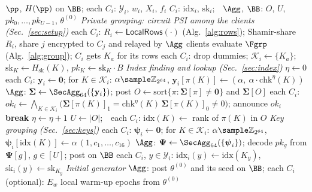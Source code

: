 \begin{algorithm}[t]
\caption{Offline phase: union table and keys (Fig.~\ref{fig:setup})}
\label{alg:setup}
\begin{algorithmic}[1]
\Require $\pp$, $H(\pp)$ on $\BB$; each $C_i$: $\mathcal{Y}_i$, $w_i$, $X_i$, $f_i$
\Ensure $C_i$: $\mathrm{idx}_i$, $\mathrm{sk}_i$;\ \ $\Agg$, $\BB$: $O$, $U$, $pk_0,\dots,pk_{U-1}$, $\theta^{(0)}$
\Statex \textit{Private grouping: circuit PSI among the clients (Sec.~\ref{sec:setup})}
\State each $C_i$: $R_i\gets\mathsf{LocalRows}(\cdot)$ (Alg.~\ref{alg:rows}); Shamir-share $R_i$, share $j$ encrypted to $C_j$ and relayed by $\Agg$
\State clients evaluate $\Fgrp$ (Alg.~\ref{alg:group}); $C_i$ gets $K_a$ for its rows
\State each $C_i$: drop dummies; $\mathcal{K}_i\gets\{K_a\}$; $\mathrm{sk}_K\gets H_{\mathrm{sk}}(K)$, $pk_K\gets\mathrm{sk}_K\cdot B$
\Statex \textit{Index finding and lookup (Sec.~\ref{sec:index})}
\State $\eta\gets0$
\Loop
  \State each $C_i$: $\mathbf{y}_i\gets\mathbf{0}$; for $K\in\mathcal{K}_i$: $\alpha\sample\mathbb{Z}_{2^{64}}$, $\mathbf{y}_i[\pi(K)]\gets(\alpha,\ \alpha\cdot\mathrm{chk}^{\eta}(K))$
  \State $\Agg$: $\boldsymbol{\Sigma}\gets\SecAgg_{64}(\{\mathbf{y}_i\})$; post $O\gets\mathrm{sort}\{\pi:\boldsymbol{\Sigma}[\pi]\neq\mathbf{0}\}$ and $\boldsymbol{\Sigma}[O]$
  \State each $C_i$: $\mathit{ok}_i\gets\bigwedge_{K\in\mathcal{K}_i}\big(\boldsymbol{\Sigma}[\pi(K)]_1=\mathrm{chk}^{\eta}(K)\,\boldsymbol{\Sigma}[\pi(K)]_0\neq0\big)$; announce $\mathit{ok}_i$
   \textbf{break} \EndIf
  \State $\eta\gets\eta+1$ 
\EndLoop
\State $U\gets|O|$;\ \ each $C_i$: $\mathrm{idx}(K)\gets$ rank of $\pi(K)$ in $O$
\Statex \textit{Key grouping (Sec.~\ref{sec:keys})}
\State each $C_i$: $\boldsymbol{\psi}_i\gets\mathbf{0}$; for $K\in\mathcal{K}_i$: $\alpha\sample\mathbb{Z}_{2^{64}}$, $\boldsymbol{\psi}_i[\mathrm{idx}(K)]\gets\alpha\,(1,c_1,\dots,c_{16})$
\State $\Agg$: $\boldsymbol{\Psi}\gets\SecAgg_{64}(\{\boldsymbol{\psi}_i\})$; decode $pk_g$ from $\boldsymbol{\Psi}[g]$, $g\in[U]$; post on $\BB$
\State each $C_i$, $y\in\mathcal{Y}_i$: $\mathrm{idx}_i(y)\gets\mathrm{idx}(K_y)$, $\mathrm{sk}_i(y)\gets\mathrm{sk}_{K_y}$
\Statex \textit{Initial generator}
\State $\Agg$: post $\theta^{(0)}$ and its seed on $\BB$; each $C_i$ (optional): $E_w$ local warm-up epochs from $\theta^{(0)}$
\end{algorithmic}
\end{algorithm}

